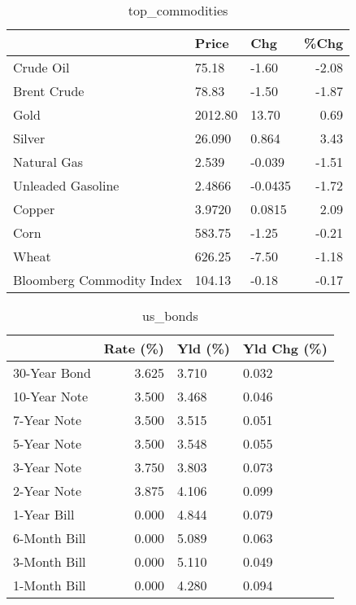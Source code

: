 \documentclass{article}%
\begin{document}
\begin{table}[htbp]%
\caption{top\_commodities}%
\centering%
\begin{adjustbox}{width=1\textwidth}%
\begin{tabular}{lllr}
\toprule
                          &   Price &     Chg &  \%Chg \\
\midrule
               Crude Oil  &   75.18 &   -1.60 & -2.08 \\
             Brent Crude  &   78.83 &   -1.50 & -1.87 \\
                    Gold  & 2012.80 &   13.70 &  0.69 \\
                  Silver  &  26.090 &   0.864 &  3.43 \\
             Natural Gas  &   2.539 &  -0.039 & -1.51 \\
       Unleaded Gasoline  &  2.4866 & -0.0435 & -1.72 \\
                  Copper  &  3.9720 &  0.0815 &  2.09 \\
                    Corn  &  583.75 &   -1.25 & -0.21 \\
                   Wheat  &  626.25 &   -7.50 & -1.18 \\
Bloomberg Commodity Index &  104.13 &   -0.18 & -0.17 \\
\bottomrule
\end{tabular}
%
\end{adjustbox}%
\end{table}

%


\begin{table}[htbp]%
\caption{us\_bonds}%
\centering%
\begin{adjustbox}{width=1\textwidth}%
\begin{tabular}{lrll}
\toprule
             &  Rate (\%) & Yld (\%) & Yld Chg (\%) \\
\midrule
30-Year Bond &     3.625 &   3.710 &       0.032 \\
10-Year Note &     3.500 &   3.468 &       0.046 \\
 7-Year Note &     3.500 &   3.515 &       0.051 \\
 5-Year Note &     3.500 &   3.548 &       0.055 \\
 3-Year Note &     3.750 &   3.803 &       0.073 \\
 2-Year Note &     3.875 &   4.106 &       0.099 \\
 1-Year Bill &     0.000 &   4.844 &       0.079 \\
6-Month Bill &     0.000 &   5.089 &       0.063 \\
3-Month Bill &     0.000 &   5.110 &       0.049 \\
1-Month Bill &     0.000 &   4.280 &       0.094 \\
\bottomrule
\end{tabular}
%
\end{adjustbox}%
\end{table}
\end{document}
